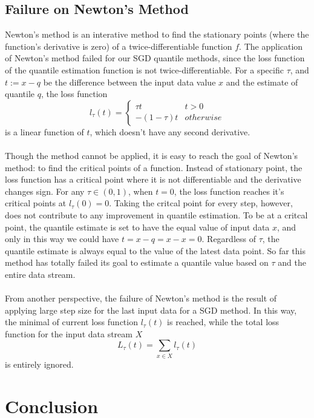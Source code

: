 \documentclass[12pt]{article}
\begin{document}
\subsection{Failure on Newton's Method}
Newton's method is an interative method to find the stationary points (where the function's derivative is zero) of a twice-differentiable function $f$. The application of Newton's method failed for our SGD quantile methods, since the loss function of the quantile estimation function is not twice-differentiable. For a specific $\tau$, and $t := x - q$ be the difference between the input data value $x$ and the estimate of quantile $q$, the loss function 
$$
l_\tau(t)= 
    \begin{cases}
        \tau t & t > 0\\
        -(1-\tau) t & otherwise
    \end{cases}
$$
is a linear function of $t$, which doesn't have any second derivative. 
\\\\
Though the method cannot be applied, it is easy to reach the goal of Newton's method: to find the critical points of a function. Instead of stationary point, the loss function has a critical point where it is not differentiable and the derivative changes sign. For any $\tau \in (0,1)$, when $t=0$, the loss function reaches it's critical points at $l_\tau(0) = 0$. Taking the critcal point for every step, however, does not contribute to any improvement in quantile estimation. To be at a critcal point, the quantile estimate is set to have the equal value of input data $x$, and only in this way we could have $t = x-q = x-x = 0$. Regardless of $\tau$, the quantile estimate is always equal to the value of the latest data point. So far this method has totally failed its goal to estimate a quantile value based on $\tau$ and the entire data stream.
\\\\
From another perspective, the failure of Newton's method is the result of applying large step size for the last input data for a SGD method. In this way, the minimal of current loss function $l_\tau(t)$ is reached, while the total loss function for the input data stream $X$
$$
L_{\tau}(t) = \sum_{x \in X} l_{\tau}(t)
$$
is entirely ignored.
\section{Conclusion}
\end{document}

